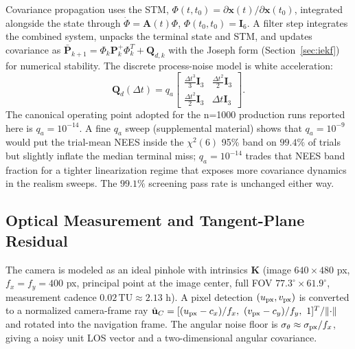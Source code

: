 \documentclass[10pt,twocolumn]{article}
\newcommand{\vect}[1]{\mathbf{#1}}
\newcommand{\mat}[1]{\mathbf{#1}}
\newcommand{\unit}[1]{\hat{\mathbf{#1}}}
\newcommand{\TU}{\mathrm{TU}}
\newcommand{\chisq}{\chi^2}
\begin{document}
Covariance propagation uses the STM, $\Phi(t,t_0)=\partial\vect{x}(t)/\partial\vect{x}(t_0)$, integrated alongside the state through $\dot{\Phi}=\mat{A}(t)\Phi$, $\Phi(t_0,t_0)=\mat{I}_6$.  A filter step integrates the combined system, unpacks the terminal state and STM, and updates covariance as $\bar{\vect{P}}_{k+1}=\Phi_k\vect{P}_k^+\Phi_k^T+\vect{Q}_{d,k}$ with the Joseph form (Section~\ref{sec:iekf}) for numerical stability.  The discrete process-noise model is white acceleration:
\begin{equation}
\vect{Q}_d(\Delta t)=q_a
\begin{bmatrix}
\frac{\Delta t^3}{3}\mat{I}_3 & \frac{\Delta t^2}{2}\mat{I}_3\\
\frac{\Delta t^2}{2}\mat{I}_3 & \Delta t\mat{I}_3
\end{bmatrix}.
\label{eq:q}
\end{equation}
The canonical operating point adopted for the n=1000 production runs reported here is $q_a=10^{-14}$.  A fine $q_a$ sweep (supplemental material) shows that $q_a=10^{-9}$ would put the trial-mean NEES inside the $\chisq(6)$ 95\% band on $99.4\%$ of trials but slightly inflate the median terminal miss; $q_a=10^{-14}$ trades that NEES band fraction for a tighter linearization regime that exposes more covariance dynamics in the realism sweeps.  The $99.1\%$ screening pass rate is unchanged either way.

\subsection{Optical Measurement and Tangent-Plane Residual}
The camera is modeled as an ideal pinhole with intrinsics $\mat{K}$ (image $640\times 480$ px, $f_x=f_y=400$ px, principal point at the image center, full FOV $77.3^{\circ}\times 61.9^{\circ}$, measurement cadence $0.02\,\TU\approx 2.13$ h).  A pixel detection $(u_{\rm px},v_{\rm px})$ is converted to a normalized camera-frame ray $\unit{u}_C=[(u_{\rm px}-c_x)/f_x,\ (v_{\rm px}-c_y)/f_y,\ 1]^T/\lVert\cdot\rVert$ and rotated into the navigation frame.  The angular noise floor is $\sigma_\theta\approx\sigma_{\rm px}/f_x$, giving a noisy unit LOS vector and a two-dimensional angular covariance.
\end{document}
